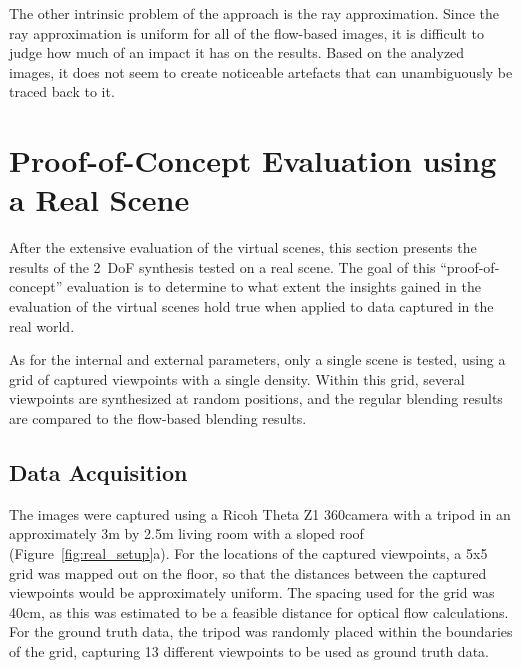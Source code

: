The other intrinsic problem of the approach is the ray approximation. 
Since the ray approximation is uniform for all of the flow-based images, it is difficult to judge how much of an impact it has on the results. Based on the analyzed images, it does not seem to create noticeable artefacts that can unambiguously be traced back to it.




















\section{Proof-of-Concept Evaluation using a Real Scene} \label{sec:pof_eval}

After the extensive evaluation of the virtual scenes, this section presents the results of the 2~DoF synthesis tested on a real scene. The goal of this ``proof-of-concept'' evaluation is to determine to what extent the insights gained in the evaluation of the virtual scenes hold true when applied to data captured in the real world.

As for the internal and external parameters, only a single scene is tested, using a grid of captured viewpoints with a single density. Within this grid, several viewpoints are synthesized at random positions, and the regular blending results are compared to the flow-based blending results.

\subsection{Data Acquisition}
The images were captured using a Ricoh Theta Z1 360\degree camera with a tripod in an approximately 3m by 2.5m living room with a sloped roof (Figure~\ref{fig:real_setup}a). For the locations of the captured viewpoints, a 5x5 grid was mapped out on the floor, so that the distances between the captured viewpoints would be approximately uniform. The spacing used for the grid was 40cm, as this was estimated to be a feasible distance for optical flow calculations. For the ground truth data, the tripod was randomly placed within the boundaries of the grid, capturing 13 different viewpoints to be used as ground truth data.

